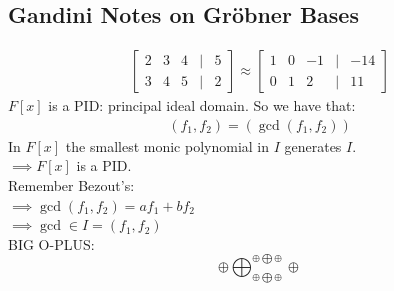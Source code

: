 \documentclass[10pt,oneside]{article}
\newcommand{\vpp}{\vspace{0.25cm}\\}
\begin{document}
\subsection*{Gandini Notes on Gröbner Bases}
\begin{align*}
    \begin{bmatrix}2&3&4&\mid &5 \\ 3&4&5&\mid &2\end{bmatrix}
    \approx 
    \begin{bmatrix}1&0&-1&\mid &-14 \\ 0&1&2&\mid &11\end{bmatrix}
\end{align*}
$F[x]$ is a PID: principal ideal domain. So we have that:
\begin{align*}
    (f_1,f_2)=(\gcd(f_1,f_2))
\end{align*}
In $F[x]$ the smallest monic polynomial in $I$ generates $I$.\\
$\implies F[x]$ is a PID.\vpp
Remember Bezout's:\\
$\implies \gcd(f_1,f_2)=af_1+bf_2$\\
$\implies \gcd \in I = (f_1,f_2)$\vpp
BIG O-PLUS:
$${\oplus\bigoplus_{\oplus\bigoplus\oplus}^{\oplus\bigoplus\oplus} \oplus}$$
\end{document}

